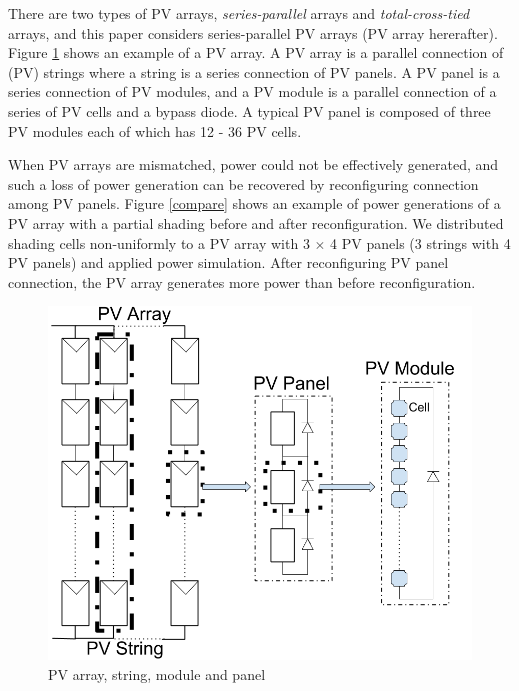 \documentclass[conference]{IEEEtran}
\begin{document}



There are two types of PV arrays, \textit{series-parallel} arrays and \textit{total-cross-tied} arrays, and this paper considers series-parallel PV arrays (PV array hererafter).
Figure \ref{model} shows an example of a PV array. A PV array is a parallel connection of (PV) strings where a string is a series connection of PV panels. A PV panel is a series connection of PV modules, and a PV module is a parallel connection of a series of PV cells and a bypass diode. A typical PV panel is composed of three PV modules each of which has 12 - 36 PV cells. 

When PV arrays are mismatched, power could not be effectively generated, and such a loss of power generation can be recovered by reconfiguring connection among PV panels.
Figure \ref{compare} shows an example of power generations of a PV array with a partial shading before and after reconfiguration. We distributed shading cells non-uniformly to a PV array with 3 $\times$ 4 PV panels (3 strings with 4 PV panels) and applied power simulation. 
After reconfiguring PV panel connection, the PV array generates more power than before reconfiguration.

\begin{figure}[t]
    \centering
    \includegraphics[width=0.6\linewidth]{fig/module.png}
    \caption{PV array, string, module and panel}
    \label{model}
\end{figure}
\end{document}
